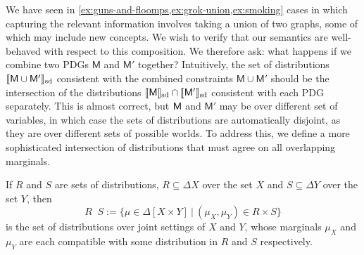 \documentclass{article}
\theoremstyle{plain}
\theoremstyle{definition}
\theoremstyle{remark}
\newcommand{\notation}[2][]{#1}
\renewcommand{\notation}[2][]{{\color{notationcolor} #2}}
\DeclarePairedDelimiter{\SD}{\llbracket}{\rrbracket_{\text{sd}}}
\DeclareMathOperator\dcap{\mathop{\dot\cap}}
\newcommand{\sfM}{\mathsf M}
\numberwithin{equation}{section}
\begin{document}
\begin{vfull}
	We have seen
        in \cref{ex:guns-and-floomps,ex:grok-union,ex:smoking} cases in
        which capturing the relevant information involves taking a
        union of two graphs, some of which may include new
        concepts. We wish to verify that our semantics are
        well-behaved with respect to this composition.	  
	We therefore ask: what happens if we combine two PDGs $\sfM$
        and $\sfM'$ together? Intuitively, the set of distributions
        $\SD{\sfM \cup \sfM'}$ consistent with the combined
        constraints $\sfM\cup \sfM'$ should be the intersection of the
        distributions $\SD{\sfM} \cap \SD{\sfM'}$ consistent
        with each PDG separately. This is almost correct, but $\sf M$
        and $\sfM'$ may be over different set of variables, in which
        case the sets of distributions are automatically disjoint, as
        they are over different sets of possible worlds. To address
        this, we define a more sophisticated intersection of
        distributions that must agree on all overlapping
        marginals. %
	
	\begin{defn}[$\dcap$]\label{def:marginal-dist-intersection}
		If $R$ and $S$ are sets of distributions, $R \subseteq \Delta X$ over the set $X$ and $S\subseteq \Delta Y$ over the set $Y$, then
			{$$R \dcap S := \Big\{ \mu \in  \Delta [X \!\times\! Y] ~\Big|~ (\mu_{X}, \mu_{Y}) \in R \times S \Big\}  $$}%
		is the set of distributions over joint settings of $X$ and $Y$, whose marginals $\mu_X$ and $\mu_Y$ are each compatible with some distribution in $R$ and $S$ respectively. 
		

\end{defn}
\end{vfull}
\end{document}
